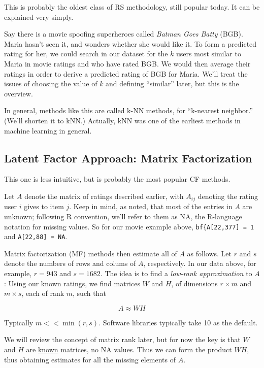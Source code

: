 This is probably the oldest class of RS methodology, still popular
today.  It can be explained very simply.

Say there is a movie spoofing superheroes called \textit{Batman Goes
Batty} (BGB).  Maria hasn't seen it, and wonders whether she would like
it.  To form a predicted rating for her, we could search in our dataset
for the $k$ users most similar to Maria in movie ratings and who have
rated BGB.  We would then average their ratings in order to derive a
predicted rating of BGB for Maria.  We'll treat the issues of choosing
the value of $k$ and defining ``similar'' later, but this is the
overview.

In general, methods like this are called k-NN methods,
for ``k-nearest neighbor.''  (We'll shorten it to kNN.)
Actually, kNN was one of the earliest methods in machine learning in
general.

\subsection{Latent Factor Approach:  Matrix Factorization}
\label{mf}

This one is less intuitive, but is probably the most popular CF methods.

Let $A$ denote the matrix of ratings described earlier, with $A_{ij}$
denoting the rating user $i$ gives to item $j$.  Keep in mind, as noted,
that most of the entries in $A$ are unknown; following R convention,
we'll refer to them as NA, the R-language notation for missing values.  
So for our movie example above, \lstinline{bf{A[22,377] = 1} and
\lstinline{A[22,88] = NA}.

Matrix factorization (MF) methods then estimate all of $A$ as follows.
Let $r$ and $s$ denote the numbers of rows and colums of $A$,
respectively.  In our data above, for example, $r = 943$ and $s = 1682$.
The idea is to find a \textit{low-rank approximation} to $A$:  Using our
known ratings, we find matrices $W$ and $H$, of dimensions $r \times m$
and $m \times s$, each of rank $m$, such that 

\begin{equation}
A \approx WH
\end{equation}

Typically $m << \min(r,s)$.  Software libraries typically take 10 as the
default.

We will review the concept of matrix rank later, but for now the key is
that $W$ and $H$ are \underline{known} matrices, no NA values.  Thus we
can form the product $WH$, thus obtaining estimates for all the missing
elements of $A$.

